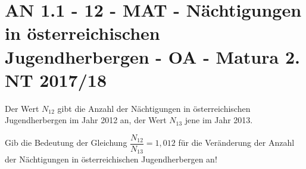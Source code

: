 \section{AN 1.1 - 12 - MAT - Nächtigungen in österreichischen Jugendherbergen - OA - Matura 2. NT 2017/18}

\begin{beispiel}[AN 1.1]{1}
Der Wert $N_{12}$ gibt die Anzahl der Nächtigungen in österreichischen Jugendherbergen im Jahr 2012 an, der Wert $N_{13}$ jene im Jahr 2013.

Gib die Bedeutung der Gleichung $\dfrac{N_{12}}{N_{13}}=1,012$ für die Veränderung der Anzahl der Nächtigungen in österreichischen Jugendherbergen an!

\end{beispiel}